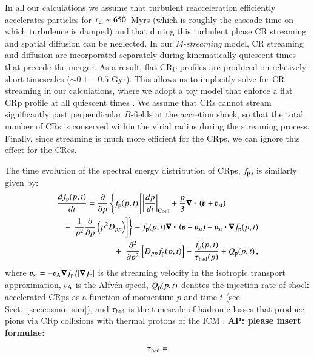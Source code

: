 \documentclass[fleqn,usenatbib,useAMS]{mnras}
\newcommand{\bcdot}{\ensuremath{%
  \mathchoice%
   {\mskip\thinmuskip\lower0.2ex\hbox{\scalebox{1.5}{$\cdot$}}\mskip\thinmuskip}}%
   {\mskip\thinmuskip\lower0.2ex\hbox{\scalebox{1.5}{$\cdot$}}\mskip\thinmuskip}%
   {\lower0.3ex\hbox{\scalebox{1.2}{$\cdot$}}}%
   {\lower0.3ex\hbox{\scalebox{1.2}{$\cdot$}}}%
}
\newcommand{\Mstream}{{\it M-streaming}\xspace}
\newcommand{\bvel}{\ensuremath{\boldsymbol{\varv}}}
\newcommand{\bnabla}{\ensuremath{\boldsymbol{\nabla}}}
\def\AP2#1{{\bf  AP2: #1}}
\def\AP#1{{\bf {\color{blue} AP: #1}}}
\begin{document}
In all our calculations we assume that turbulent reacceleration
efficiently accelerates particles for $\tau_{\mathrm{cl}}\sim650$~Myrs
(which is roughly the cascade time on which turbulence is damped) and
that during this turbulent phase CR streaming and spatial diffusion
can be neglected. In our \Mstream model, CR streaming and diffusion
are incorporated separately during kinematically quiescent times that
precede the merger. As a result, flat CRp profiles are produced on
relatively short timescales ($\sim 0.1-0.5$ Gyr). This allows us to
implicitly solve for CR streaming in our calculations, where we adopt
a toy model that enforce a flat CRp profile at all quiescent times
\citep{wiener13}. We assume that CRs cannot stream significantly past
perpendicular $B$-fields at the accretion shock, so that the total
number of CRs is conserved within the virial radius during the
streaming process. Finally, since streaming is much more efficient for
the CRps, we can ignore this effect for the CRes.

The time evolution of the spectral energy distribution of CRps,
$f_{{\mathrm{p}}}$, is similarly given by:
\begin{eqnarray}
\lefteqn{
  {{d f_{\rmn{p}}(p,t)}\over{d t}} =
  {{\partial }\over{\partial p}}
  \left\{
  f_{\rmn{p}}(p,t)\left[ \left|{{dp}\over{dt}}\right|_{\rm Coul}
    + \frac{p}{3}\bnabla\bcdot \left(\bvel+\bvel_{\rmn{st}}\right)\right.\right.}
\nonumber\\
&&-\left.\left. {1\over{p^2}}{{\partial }\over{\partial p}}\left(p^2 D_{pp}\right)
\right]\right\} - f_{\rmn{p}}(p,t) \bnabla\bcdot \left(\bvel+\bvel_{\rmn{st}}\right) 
- \bvel_{\rmn{st}}\bcdot\bnabla f_{\rmn{p}}(p,t)
\nonumber\\
&&+\,\,\, {{\partial^2 }\over{\partial p^2}}
\left[ D_{pp} f_{\rmn{p}}(p,t) \right] - {{f_{\rmn{p}}(p,t)}\over{\tau_{\rm had}(p)}}
+ Q_{\rmn{p}}(p,t)\, ,
\label{eq:FP_p}
\end{eqnarray}
where $\bvel_{\rmn{st}}=-\varv_{\rmn{A}}\bnabla f_{\rmn{p}}/|\bnabla
f_{\rmn{p}}|$ is the streaming velocity in the isotropic transport
approximation, $\varv_{\rmn{A}}$ is the Alfv\'en speed,
$Q_{{\mathrm{p}}}(p,t)$ denotes the injection rate of shock accelerated
CRps as a function of momentum $p$ and time $t$ (see
Sect.~\ref{sec:cosmo_sim}), and $\tau_{\rm had}$ is the timescale of
hadronic losses that produce pions via CRp collisions with thermal
protons of the ICM \cite[e.g.][]{brunetti11}.
\AP{please insert formulae:}
\begin{eqnarray}
  \tau_{\rm had} = 
\end{eqnarray}
\end{document}
